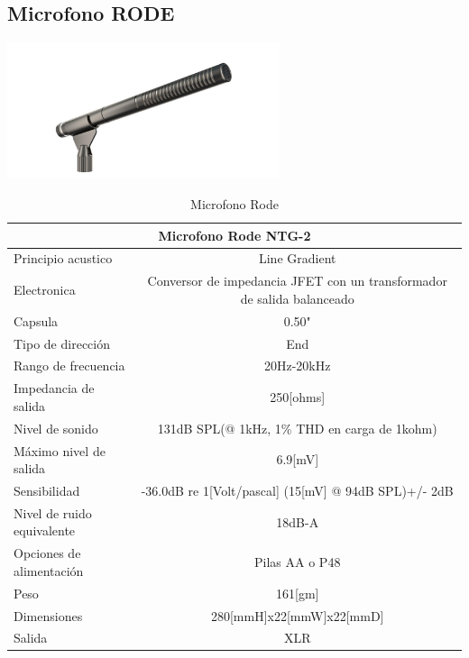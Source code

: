 \documentclass[user_manual.tex]{subfiles}
\begin{document}
\subsection{Microfono RODE}

\begin{center}
\includegraphics[width=0.6\textwidth]{Figures/Hardware/Partes/Rode.jpg}
\label{fig:Hardware:Partes:Microfono:Rode}
\end{center}


\begin{table}[H]
\centering
\resizebox{17cm}{!} {
\begin{tabular}{|l|l|}%

\hline
\multicolumn{2}{|c|}{Microfono Rode NTG-2} \\ \hline %
Principio acustico &  \multicolumn{1}{|c|}{Line Gradient}\\ \hline
Electronica & \multicolumn{1}{|c|}{Conversor de impedancia JFET con un transformador de salida balanceado}\\ \hline
Capsula & \multicolumn{1}{|c|}{0.50"}\\ \hline
Tipo de dirección & \multicolumn{1}{|c|}{End}\\ \hline
Rango de frecuencia & \multicolumn{1}{|c|}{20Hz-20kHz}\\ \hline
Impedancia de salida & \multicolumn{1}{|c|}{250[ohms]}\\ \hline
Nivel de sonido & \multicolumn{1}{|c|}{131dB SPL(@ 1kHz, 1\% THD en carga de 1kohm)}\\ \hline
Máximo nivel de salida & \multicolumn{1}{|c|}{6.9[mV]}\\ \hline
Sensibilidad & \multicolumn{1}{|c|}{-36.0dB re 1[Volt/pascal] (15[mV] @ 94dB SPL)+/- 2dB}\\ \hline
Nivel de ruido equivalente & \multicolumn{1}{|c|}{18dB-A}\\ \hline
Opciones de alimentación & \multicolumn{1}{|c|}{Pilas AA o P48}\\ \hline
Peso & \multicolumn{1}{|c|}{161[gm]}\\ \hline
Dimensiones & \multicolumn{1}{|c|}{280[mmH]x22[mmW]x22[mmD]}\\ \hline
Salida & \multicolumn{1}{|c|}{XLR}\\ \hline


\end{tabular}
}
\caption{Microfono Rode}
\label{Microfono Rode}

\end{table}
\vfill
\end{document}
